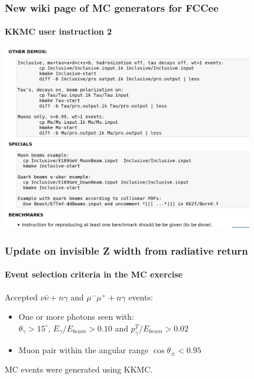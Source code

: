 \documentclass{beamer}
\newcommand{\crd}{\color{red}}
\begin{document}
\begin{frame}[fragile]
\frametitle{\bf New wiki page of MC generators for FCCee}
\framesubtitle{\bf KKMC user instruction 2}

\vspace{-3mm}
\includegraphics[width=110mm]{./wiki3k.jpg}

\end{frame}


\begin{frame}[fragile]
\frametitle{\bf Update on invisible Z width from radiative return}
\framesubtitle{\bf\crd\large Event selection criteria in the MC exercise}

Accepted $\nu\bar\nu+n\gamma$ and $\mu^-\mu^+ +n\gamma$ events:
\begin{itemize}
\item 
One or more photons seen with:\\
$\theta_\gamma >15^{\circ}$,
$E_\gamma/E_{beam}>0.10$ and $p^T_\gamma/E_{beam}>0.02$
\item
Muon pair within the angular range $\cos\theta_{\pm}<0.95$
\end{itemize}
MC events were generated using KKMC.

\end{frame}
\end{document}
